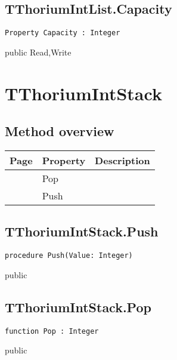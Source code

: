 \subsection{TThoriumIntList.Capacity}
\label{thoriumcore:thorium:tthoriumintlist:capacity}
\begin{FPCList}
\Synopsis
\Declaration 

\begin{verbatim}
Property Capacity : Integer
\end{verbatim}
\Visibility
public
\Access
Read,Write
\Description
\end{FPCList}
\section{TThoriumIntStack}
\label{thoriumcore:thorium:tthoriumintstack}
\subsection{Method overview}
\label{thoriumcore:thorium:tthoriumintstack:methods}
\begin{tabularx}{\textwidth}{llX}
Page & Property & Description  \\ \hline
\pageref{thoriumcore:thorium:tthoriumintstack:pop} & Pop  &  \\
\pageref{thoriumcore:thorium:tthoriumintstack:push} & Push  &  \\
\hline
\end{tabularx}
\subsection{TThoriumIntStack.Push}
\label{thoriumcore:thorium:tthoriumintstack:push}
\begin{FPCList}
\Synopsis
\Declaration 

\begin{verbatim}
procedure Push(Value: Integer)
\end{verbatim}
\Visibility
public
\Description
\Errors
\end{FPCList}
\subsection{TThoriumIntStack.Pop}
\label{thoriumcore:thorium:tthoriumintstack:pop}
\begin{FPCList}
\Synopsis
\Declaration 

\begin{verbatim}
function Pop : Integer
\end{verbatim}
\Visibility
public
\Description
\Errors
\end{FPCList}
